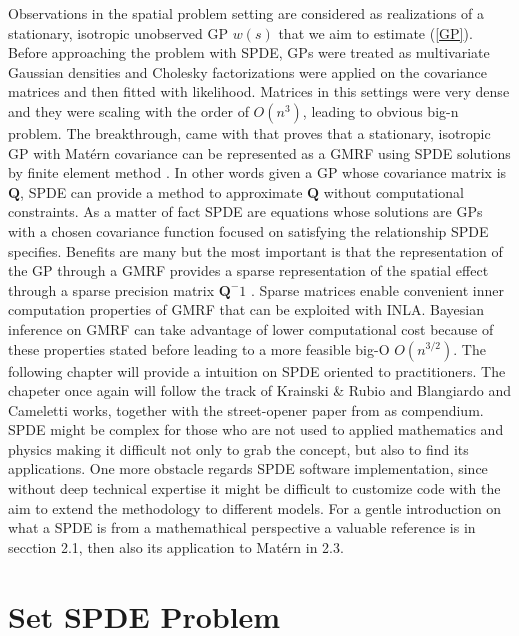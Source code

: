 \documentclass[
  12pt,
  a4paper,
  oneside]{book}
\begin{document}
Observations in the spatial problem setting are considered as realizations of a stationary, isotropic unobserved GP \(w(s)\) that we aim to estimate (\ref{GP}). Before approaching the problem with SPDE, GPs were treated as multivariate Gaussian densities and Cholesky factorizations were applied on the covariance matrices and then fitted with likelihood. Matrices in this settings were very dense and they were scaling with the order of \(O\left(n^{3}\right)\), leading to obvious big-n problem.
The breakthrough, came with \citet{Lindgren2011} that proves that a stationary, isotropic GP with Matérn covariance can be represented as a GMRF using SPDE solutions by finite element method \citep{Krainski-Rubio}. In other words given a GP whose covariance matrix is \(\boldsymbol{Q}\), SPDE can provide a method to approximate \(\boldsymbol{Q}\) without computational constraints. As a matter of fact SPDE are equations whose solutions are GPs with a chosen covariance function focused on satisfying the relationship SPDE specifies.
Benefits are many but the most important is that the representation of the GP through a GMRF provides a sparse representation of the spatial effect through a sparse precision matrix \(\boldsymbol{Q}^-1\) . Sparse matrices enable convenient inner computation properties of GMRF that can be exploited with INLA. Bayesian inference on GMRF can take advantage of lower computational cost because of these properties stated before leading to a more feasible big-O \(O\left(n^{3 / 2}\right)\). The following chapter will provide a intuition on SPDE oriented to practitioners. The chapeter once again will follow the track of Krainski \& Rubio \citeyearpar{Krainski-Rubio} and Blangiardo and Cameletti \citeyearpar{Blangiardo-Cameletti} works, together with the street-opener paper from \citet{Miller2019} as compendium. SPDE might be complex for those who are not used to applied mathematics and physics making it difficult not only to grab the concept, but also to find its applications. One more obstacle regards SPDE software implementation, since without deep technical expertise it might be difficult to customize code with the aim to extend the methodology to different models. For a gentle introduction on what a SPDE is from a mathemathical perspective a valuable reference is \citet{Miller2019} in secction 2.1, then also its application to Matérn in 2.3.

\hypertarget{set-spde-problem}{%
\section{Set SPDE Problem}\label{set-spde-problem}}
\end{document}
